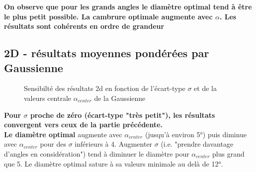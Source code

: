 \documentclass[conference]{IEEEtran}
\begin{document}
\textbf{On observe que pour les grands angles le diamètre optimal tend à être le plus petit possible. La cambrure optimale augmente avec $\alpha$. Les résultats sont cohérents en ordre de grandeur}


\subsection{2D - résultats moyennes pondérées par Gaussienne}

\begin{figure}[h!]
    \centering
    \hfill 
    \caption{Sensibilté des résultats 2d en fonction de l'écart-type $\sigma$ et de la valeurs centrale $\alpha_{center}$ de la Gaussienne}
    \label{fig:gaussian sensibility 2d}
\end{figure}

\textbf{Pour $\sigma$ proche de zéro (écart-type "très petit"), les résultats convergent vers ceux de la partie précédente. }\\

\textbf{Le diamètre optimal} augmente avec $\alpha_{center}$ (jusqu'à environ 5°) puis diminue avec $\alpha_{center}$ pour des $\sigma$ inférieurs à 4. Augmenter $\sigma$ (i.e. "prendre davantage d'angles en considération") tend à diminuer le diamètre pour $\alpha_{center}$ plus grand que 5. Le diamètre optimal sature à sa valeurs minimale au delà de 12°. \\
\end{document}
